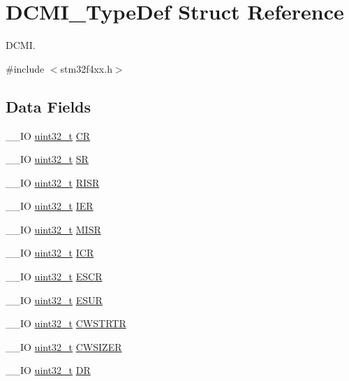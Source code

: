 \hypertarget{struct_d_c_m_i___type_def}{\section{D\-C\-M\-I\-\_\-\-Type\-Def Struct Reference}
\label{struct_d_c_m_i___type_def}
}


D\-C\-M\-I.  




{\ttfamily \#include $<$stm32f4xx.\-h$>$}

\subsection*{Data Fields}
\begin{DoxyCompactItemize}
\item 
\-\_\-\-\_\-\-I\-O \hyperlink{stdint_8h_a435d1572bf3f880d55459d9805097f62}{uint32\-\_\-t} \hyperlink{struct_d_c_m_i___type_def_a3cfcc9860ca551cbcb10c1c3dd4304f0}{C\-R}
\item 
\-\_\-\-\_\-\-I\-O \hyperlink{stdint_8h_a435d1572bf3f880d55459d9805097f62}{uint32\-\_\-t} \hyperlink{struct_d_c_m_i___type_def_a1bbe4b3cc5d9552526bec462b42164d5}{S\-R}
\item 
\-\_\-\-\_\-\-I\-O \hyperlink{stdint_8h_a435d1572bf3f880d55459d9805097f62}{uint32\-\_\-t} \hyperlink{struct_d_c_m_i___type_def_ae0aba9f38498cccbe0186b7813825026}{R\-I\-S\-R}
\item 
\-\_\-\-\_\-\-I\-O \hyperlink{stdint_8h_a435d1572bf3f880d55459d9805097f62}{uint32\-\_\-t} \hyperlink{struct_d_c_m_i___type_def_a91ce93b57d8382147574c678ee497c63}{I\-E\-R}
\item 
\-\_\-\-\_\-\-I\-O \hyperlink{stdint_8h_a435d1572bf3f880d55459d9805097f62}{uint32\-\_\-t} \hyperlink{struct_d_c_m_i___type_def_ab367c4ca2e8ac87238692e6d55d622ec}{M\-I\-S\-R}
\item 
\-\_\-\-\_\-\-I\-O \hyperlink{stdint_8h_a435d1572bf3f880d55459d9805097f62}{uint32\-\_\-t} \hyperlink{struct_d_c_m_i___type_def_a0371fc07916e3043e1151eaa97e172c9}{I\-C\-R}
\item 
\-\_\-\-\_\-\-I\-O \hyperlink{stdint_8h_a435d1572bf3f880d55459d9805097f62}{uint32\-\_\-t} \hyperlink{struct_d_c_m_i___type_def_a52c16b920a3f25fda961d0cd29749433}{E\-S\-C\-R}
\item 
\-\_\-\-\_\-\-I\-O \hyperlink{stdint_8h_a435d1572bf3f880d55459d9805097f62}{uint32\-\_\-t} \hyperlink{struct_d_c_m_i___type_def_af00a94620e33f4eff74430ff25c12b94}{E\-S\-U\-R}
\item 
\-\_\-\-\_\-\-I\-O \hyperlink{stdint_8h_a435d1572bf3f880d55459d9805097f62}{uint32\-\_\-t} \hyperlink{struct_d_c_m_i___type_def_a4d58830323e567117c12ae3feac613b9}{C\-W\-S\-T\-R\-T\-R}
\item 
\-\_\-\-\_\-\-I\-O \hyperlink{stdint_8h_a435d1572bf3f880d55459d9805097f62}{uint32\-\_\-t} \hyperlink{struct_d_c_m_i___type_def_a1b9c8048339e19b110ecfbea486f55df}{C\-W\-S\-I\-Z\-E\-R}
\item 
\-\_\-\-\_\-\-I\-O \hyperlink{stdint_8h_a435d1572bf3f880d55459d9805097f62}{uint32\-\_\-t} \hyperlink{struct_d_c_m_i___type_def_a266cec1031b0be730b0e35523f5e2934}{D\-R}
\end{DoxyCompactItemize}


